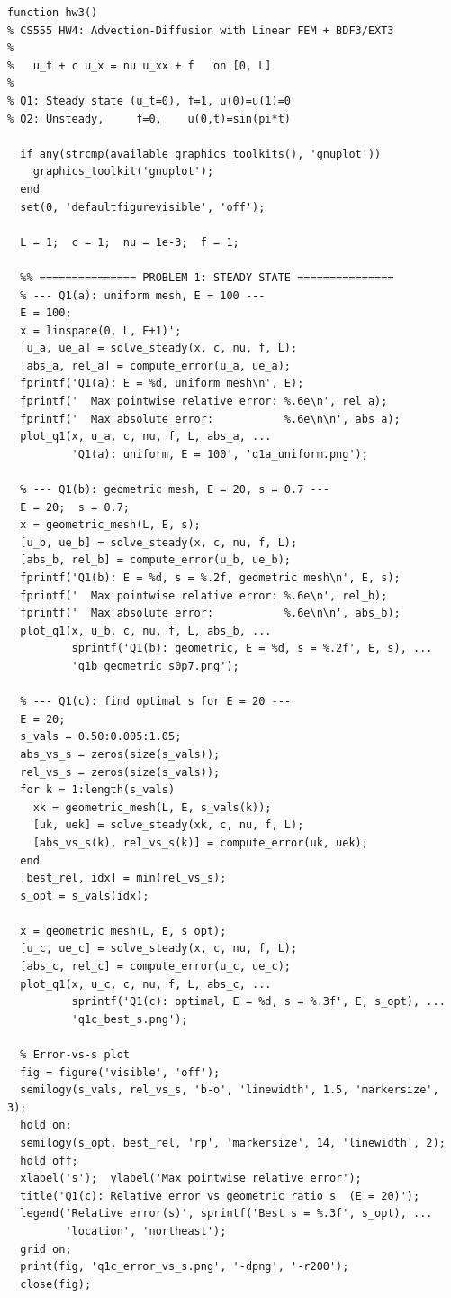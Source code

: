 \documentclass[11pt]{article}
\begin{document}
\begin{lstlisting}[caption={Main function and FEM assembly (\texttt{hw3.m}, lines 1--209).}]
function hw3()
% CS555 HW4: Advection-Diffusion with Linear FEM + BDF3/EXT3
%
%   u_t + c u_x = nu u_xx + f   on [0, L]
%
% Q1: Steady state (u_t=0), f=1, u(0)=u(1)=0
% Q2: Unsteady,     f=0,    u(0,t)=sin(pi*t)

  if any(strcmp(available_graphics_toolkits(), 'gnuplot'))
    graphics_toolkit('gnuplot');
  end
  set(0, 'defaultfigurevisible', 'off');

  L = 1;  c = 1;  nu = 1e-3;  f = 1;

  %% =============== PROBLEM 1: STEADY STATE ===============
  % --- Q1(a): uniform mesh, E = 100 ---
  E = 100;
  x = linspace(0, L, E+1)';
  [u_a, ue_a] = solve_steady(x, c, nu, f, L);
  [abs_a, rel_a] = compute_error(u_a, ue_a);
  fprintf('Q1(a): E = %d, uniform mesh\n', E);
  fprintf('  Max pointwise relative error: %.6e\n', rel_a);
  fprintf('  Max absolute error:           %.6e\n\n', abs_a);
  plot_q1(x, u_a, c, nu, f, L, abs_a, ...
          'Q1(a): uniform, E = 100', 'q1a_uniform.png');

  % --- Q1(b): geometric mesh, E = 20, s = 0.7 ---
  E = 20;  s = 0.7;
  x = geometric_mesh(L, E, s);
  [u_b, ue_b] = solve_steady(x, c, nu, f, L);
  [abs_b, rel_b] = compute_error(u_b, ue_b);
  fprintf('Q1(b): E = %d, s = %.2f, geometric mesh\n', E, s);
  fprintf('  Max pointwise relative error: %.6e\n', rel_b);
  fprintf('  Max absolute error:           %.6e\n\n', abs_b);
  plot_q1(x, u_b, c, nu, f, L, abs_b, ...
          sprintf('Q1(b): geometric, E = %d, s = %.2f', E, s), ...
          'q1b_geometric_s0p7.png');

  % --- Q1(c): find optimal s for E = 20 ---
  E = 20;
  s_vals = 0.50:0.005:1.05;
  abs_vs_s = zeros(size(s_vals));
  rel_vs_s = zeros(size(s_vals));
  for k = 1:length(s_vals)
    xk = geometric_mesh(L, E, s_vals(k));
    [uk, uek] = solve_steady(xk, c, nu, f, L);
    [abs_vs_s(k), rel_vs_s(k)] = compute_error(uk, uek);
  end
  [best_rel, idx] = min(rel_vs_s);
  s_opt = s_vals(idx);

  x = geometric_mesh(L, E, s_opt);
  [u_c, ue_c] = solve_steady(x, c, nu, f, L);
  [abs_c, rel_c] = compute_error(u_c, ue_c);
  plot_q1(x, u_c, c, nu, f, L, abs_c, ...
          sprintf('Q1(c): optimal, E = %d, s = %.3f', E, s_opt), ...
          'q1c_best_s.png');

  % Error-vs-s plot
  fig = figure('visible', 'off');
  semilogy(s_vals, rel_vs_s, 'b-o', 'linewidth', 1.5, 'markersize', 3);
  hold on;
  semilogy(s_opt, best_rel, 'rp', 'markersize', 14, 'linewidth', 2);
  hold off;
  xlabel('s');  ylabel('Max pointwise relative error');
  title('Q1(c): Relative error vs geometric ratio s  (E = 20)');
  legend('Relative error(s)', sprintf('Best s = %.3f', s_opt), ...
         'location', 'northeast');
  grid on;
  print(fig, 'q1c_error_vs_s.png', '-dpng', '-r200');
  close(fig);


\end{lstlisting}
\end{document}
